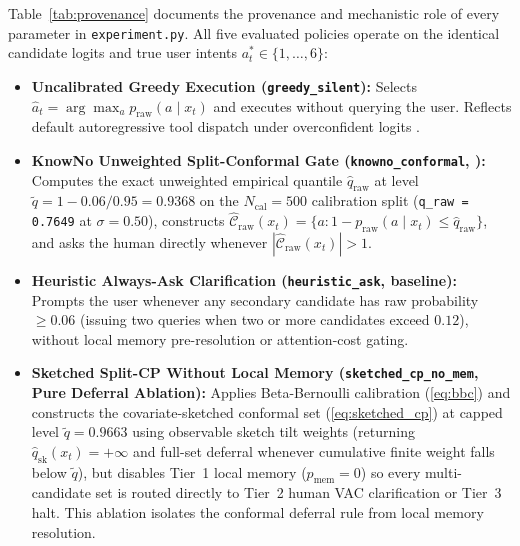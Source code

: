 \documentclass[11pt]{article}
\begin{document}
Table~\ref{tab:provenance} documents the provenance and mechanistic role of every parameter in \texttt{experiment.\linebreak[0]py}. All five evaluated policies operate on the identical candidate logits and true user intents $a_t^* \in \{1,\allowbreak \dots,\allowbreak 6\}$:
\begin{itemize}
  \item \textbf{Uncalibrated Greedy Execution (\texttt{greedy\_\linebreak[0]silent}):} Selects $\hat{a}_t = \arg\max_{a} p_{\mathrm{raw}}(a \mid x_t)$ and executes without querying the user. Reflects default autoregressive tool dispatch under overconfident logits \citep{arghal2026confidence, yao2024taubench}.
  \item \textbf{KnowNo Unweighted Split-Conformal Gate (\texttt{knowno\_\linebreak[0]conformal}, \citet{ren2023knowno}):} Computes the exact unweighted empirical quantile $\hat{q}_{\mathrm{raw}}$ at level $\tilde{q} = 1 - 0.06/0.95 = 0.9368$ on the $N_{\mathrm{cal}}=500$ calibration split (\texttt{q\_\linebreak[0]raw = 0.7649} at $\sigma=0.50$), constructs $\hat{\mathcal{C}}_{\mathrm{raw}}(x_t) = \{a: 1 - p_{\mathrm{raw}}(a \mid x_t) \le \hat{q}_{\mathrm{raw}}\}$, and asks the human directly whenever $|\hat{\mathcal{C}}_{\mathrm{raw}}(x_t)| > 1$.
  \item \textbf{Heuristic Always-Ask Clarification (\texttt{heuristic\_\linebreak[0]ask}, \citet{zhang2024clarify} baseline):} Prompts the user whenever any secondary candidate has raw probability $\ge 0.06$ (issuing two queries when two or more candidates exceed $0.12$), without local memory pre-resolution or attention-cost gating.
  \item \textbf{Sketched Split-CP Without Local Memory (\texttt{sketched\_\linebreak[0]cp\_\linebreak[0]no\_\linebreak[0]mem}, Pure Deferral Ablation):} Applies Beta-Bernoulli calibration (\ref{eq:bbc}) and constructs the covariate-sketched conformal set (\ref{eq:sketched_cp}) at capped level $\tilde{q} = 0.9663$ using observable sketch tilt weights (returning $\hat{q}_{\mathrm{sk}}(x_t) = +\infty$ and full-set deferral whenever cumulative finite weight falls below $\tilde{q}$), but disables Tier~1 local memory ($p_{\mathrm{mem}}=0$) so every multi-candidate set is routed directly to Tier~2 human VAC clarification or Tier~3 halt. This ablation isolates the conformal deferral rule from local memory resolution.

\end{itemize}
\end{document}
